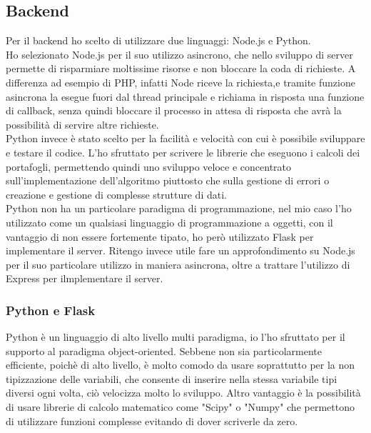 \subsection{Backend}
Per il backend ho scelto di utilizzare due linguaggi: Node.js e Python. \\
Ho selezionato Node.js per il suo utilizzo asincrono, che nello sviluppo di server permette di risparmiare moltissime risorse e non bloccare la coda di richieste. A differenza ad esempio di PHP, infatti Node riceve la richiesta,e tramite funzione asincrona la esegue fuori dal thread principale e richiama in risposta una funzione di callback, senza quindi bloccare il processo in attesa di risposta che avrà la possibilità di servire altre richieste.\\
Python invece è stato scelto per la facilità e velocità con cui è possibile sviluppare e testare il codice. L'ho sfruttato per scrivere le librerie che eseguono i calcoli dei portafogli, permettendo quindi uno sviluppo veloce e concentrato sull'implementazione dell'algoritmo piuttosto che sulla gestione di errori o creazione e gestione di complesse strutture di dati.\\
Python non ha un particolare paradigma di programmazione, nel mio caso l'ho utilizzato come un qualsiasi linguaggio di programmazione a oggetti, con il vantaggio di non essere fortemente tipato, ho però utilizzato Flask per implementare il server. Ritengo invece utile fare un approfondimento su Node.js per il suo particolare utilizzo in maniera asincrona, oltre a trattare l'utilizzo di Express per ilmplementare il server.

\subsubsection{Python e Flask}
Python è un linguaggio di alto livello multi paradigma, io l'ho sfruttato per il supporto al paradigma object-oriented. Sebbene non sia particolarmente efficiente, poichè di alto livello, è molto comodo da usare soprattutto per la non tipizzazione delle variabili, che consente di inserire nella stessa variabile tipi diversi ogni volta, ciò velocizza molto lo sviluppo. Altro vantaggio è la possibilità di usare librerie di calcolo matematico come "Scipy" o "Numpy" che permettono di utilizzare funzioni complesse evitando di dover scriverle da zero.\\


